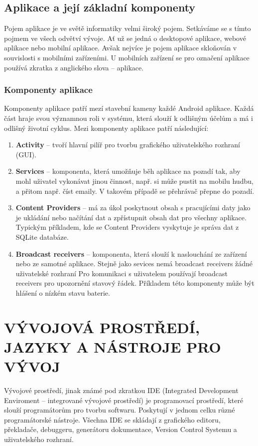 \documentclass{vskpou} %
\begin{document}
\subsection{Aplikace a její základní komponenty}
Pojem aplikace je ve světě informatiky velmi široký pojem. Setkáváme se s tímto pojmem ve všech odvětví vývoje. Ať už se jedná o desktopové aplikace, webové aplikace nebo mobilní aplikace. Avšak nejvíce je pojem aplikace skloňován v souvislosti s mobilními zařízeními. U mobilních zařízení se pro označení aplikace používá zkratka  z anglického slova  – aplikace.

\subsubsection{Komponenty aplikace}
Komponenty aplikace patří mezí stavební kameny každé Android aplikace. Každá část hraje svou významnou roli v systému, která slouží k odlišným účelům a má i odlišný životní cyklus. Mezi komponenty aplikace patří následující:

\begin{enumerate}
\item \textbf{Activity} -- tvoří hlavní pilíř pro tvorbu grafického uživatelského rozhraní (GUI).
\item \textbf{Services} -- komponenta, která umožňuje běh aplikace na pozadí tak, aby mohl uživatel vykonávat jinou činnost, např. si může pustit na mobilu hudbu, a přitom např. číst emaily. V takovém případě se přehrávač přepne do pozadí.
\item \textbf{Content Providers} -- má za úkol poskytnout obsah s pracujícími daty jako je ukládání nebo načítání dat a zpřístupnit obsah dat pro všechny aplikace. Typickým příkladem, kde se Content Providers vyskytuje je správa dat z SQLite databáze.
\item \textbf{Broadcast receivers} -- komponenta, která slouží k naslouchání ze zařízení nebo ze samotné aplikace. Stejně jako sevices nemá broadcast receivers žádné uživatelské rozhraní Pro komunikaci s uživatelem používají broadcast receivers pro upozornění stavový řádek. Příkladem této komponenty může být hlášení o nízkém stavu baterie.
\end{enumerate}


\section{VÝVOJOVÁ PROSTŘEDÍ, JAZYKY A NÁSTROJE PRO VÝVOJ}
Vývojové prostředí, jinak známé pod zkratkou IDE (Integrated Development Enviroment – integrované vývojové prostředí) je programovací prostředí, které slouží programátorům pro tvorbu softwaru. Poskytují v jednom celku různé programátorské nástroje. Všechna IDE se skládají z grafického editoru, překladače, debuggeru, generátoru dokumentace, Version Control Systemu a uživatelského rozhraní.
\end{document}
